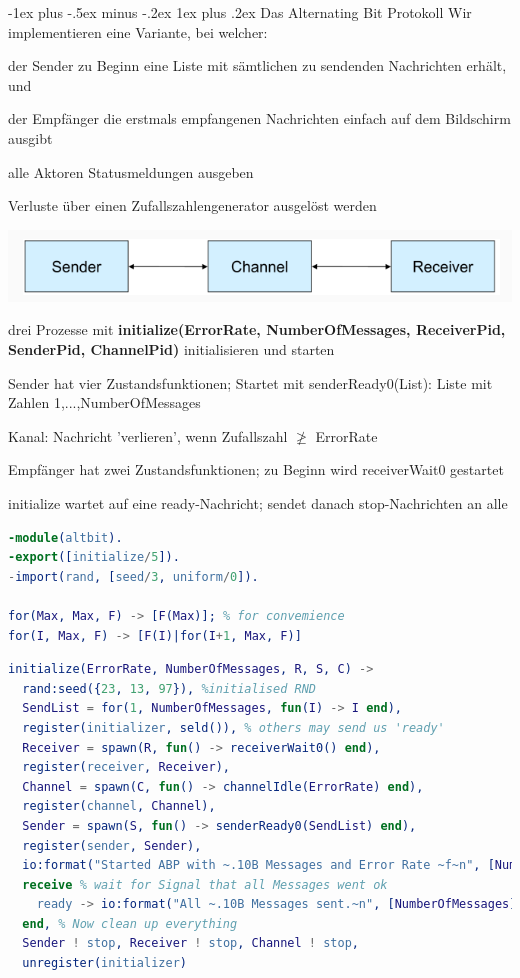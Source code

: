 \documentclass[10pt]{article}
\makeatletter
\renewcommand{\subsubsection}{\@startsection{subsubsection}{3}{0mm}%
                                {-1ex plus -.5ex minus -.2ex}%
                                {1ex plus .2ex}%
                                {\normalfont\small\bfseries}}
\makeatother
\begin{document}
\subsubsection{Das Alternating Bit Protokoll}
Wir implementieren eine Variante, bei welcher: 
\begin{itemize*}
  \item der Sender zu Beginn eine Liste mit sämtlichen zu sendenden Nachrichten erhält, und
  \item der Empfänger die erstmals empfangenen Nachrichten einfach auf dem Bildschirm ausgibt
  \item alle Aktoren Statusmeldungen ausgeben
  \item Verluste über einen Zufallszahlengenerator ausgelöst werden
\end{itemize*}
\begin{center}
  \includegraphics[width=0.4\linewidth]{Assets/Programmierparadigmen-alternate-bit-protokoll.png}
\end{center}
drei Prozesse mit \textbf{initialize(ErrorRate, NumberOfMessages, ReceiverPid, SenderPid, ChannelPid)} initialisieren und starten
\begin{itemize*}
  \item Sender hat vier Zustandsfunktionen; Startet mit senderReady0(List): Liste mit Zahlen 1,...,NumberOfMessages
  \item Kanal: Nachricht 'verlieren', wenn Zufallszahl $\ngeq$ ErrorRate
  \item Empfänger hat zwei Zustandsfunktionen; zu Beginn wird receiverWait0 gestartet
  \item initialize wartet auf eine ready-Nachricht; sendet danach stop-Nachrichten an alle
\end{itemize*}
\begin{lstlisting}[language=erlang]
-module(altbit).
-export([initialize/5]).
-import(rand, [seed/3, uniform/0]).

for(Max, Max, F) -> [F(Max)]; % for convemience
for(I, Max, F) -> [F(I)|for(I+1, Max, F)]
\end{lstlisting}

\begin{lstlisting}[language=erlang]
initialize(ErrorRate, NumberOfMessages, R, S, C) ->
  rand:seed({23, 13, 97}), %initialised RND
  SendList = for(1, NumberOfMessages, fun(I) -> I end),
  register(initializer, seld()), % others may send us 'ready'
  Receiver = spawn(R, fun() -> receiverWait0() end),
  register(receiver, Receiver),
  Channel = spawn(C, fun() -> channelIdle(ErrorRate) end),
  register(channel, Channel),
  Sender = spawn(S, fun() -> senderReady0(SendList) end),
  register(sender, Sender),
  io:format("Started ABP with ~.10B Messages and Error Rate ~f~n", [NumberOfMessages, ErrorRate]),
  receive % wait for Signal that all Messages went ok
    ready -> io:format("All ~.10B Messages sent.~n", [NumberOfMessages])
  end, % Now clean up everything
  Sender ! stop, Receiver ! stop, Channel ! stop,
  unregister(initializer)
\end{lstlisting}
\end{document}
